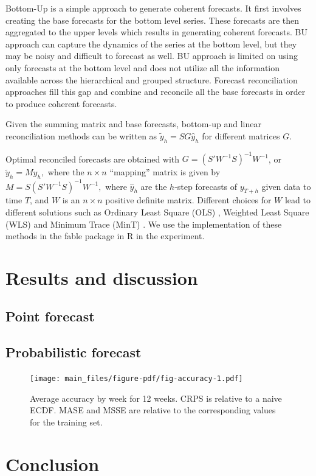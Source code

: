\documentclass[
  authoryear,
  preprint,
  3p]{elsarticle}
\begin{document}
Bottom-Up is a simple approach to generate coherent forecasts. It first
involves creating the base forecasts for the bottom level series. These
forecasts are then aggregated to the upper levels which results in
generating coherent forecasts. BU approach can capture the dynamics of
the series at the bottom level, but they may be noisy and difficult to
forecast as well. BU approach is limited on using only forecasts at the
bottom level and does not utilize all the information available across
the hierarchical and grouped structure. Forecast reconciliation
approaches fill this gap and combine and reconcile all the base
forecasts in order to produce coherent forecasts.

Given the summing matrix and base forecasts, bottom-up and linear
reconciliation methods can be written as \(\tilde{y}_h = SG\hat{y}_h\)
for different matrices \(G\).

Optimal reconciled forecasts are obtained with
\(G=(S'W^{-1}S)^{-1}W^{-1}\), or \(\tilde{y}_h = M\hat{y}_h,\) where the
\(n\times n\) ``mapping'' matrix is given by
\(M = S(S'W^{-1}S)^{-1}W^{-1},\) where \(\hat{y}_h\) are the \(h\)-step
forecasts of \(y_{T+h}\) given data to time \(T\), and \(W\) is an
\(n \times n\) positive definite matrix. Different choices for \(W\)
lead to different solutions such as Ordinary Least Square (OLS) ,
Weighted Least Square (WLS) and Minimum Trace (MinT)
\citep{WicEtAl2019}. We use the implementation of these methods in the
fable package in R in the experiment.

\hypertarget{sec-result}{%
\section{Results and discussion}\label{sec-result}}

\hypertarget{point-forecast}{%
\subsection{Point forecast}\label{point-forecast}}

\hypertarget{probabilistic-forecast}{%
\subsection{Probabilistic forecast}\label{probabilistic-forecast}}

\begin{figure}

{\centering \texttt{[image: main\_files/figure-pdf/fig-accuracy-1.pdf]}

}

\caption{\label{fig-accuracy}Average accuracy by week for 12 weeks. CRPS
is relative to a naive ECDF. MASE and MSSE are relative to the
corresponding values for the training set.}

\end{figure}

\hypertarget{sec-conclusion}{%
\section{Conclusion}\label{sec-conclusion}}


\renewcommand\refname{References}
  
\end{document}
